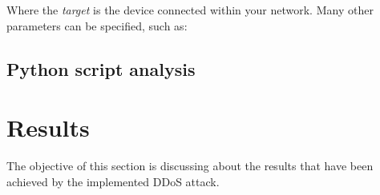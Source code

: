 \documentclass[fleqn, 10pt]{SelfArx} %
\begin{document}
Where the {\it{target}} is the device connected within your network.
Many other parameters can be specified, such as:

\subsection{Python script analysis}

\section{Results}
The objective of this section is discussing about the results that have been achieved by the implemented DDoS attack.




\nocite{*}

\end{document}
